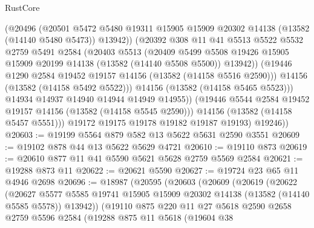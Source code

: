 \begin{lexlean}{RustCore}
\begin{coremodule}
                  (@20496
                    (@20501
                      @5472
                      @5480
                      @19311
                      @15905
                      @15909
                      @20302
                      @14138
                      (@13582 (@14140 @5480 @5473))
                      @13942))
                  (@20392
                    @308
                    @11
                    @41
                    @5513
                    @5522
                    @5532
                    @2759
                    @5491
                    @2584
                    (@20403
                      @5513
                      (@20409
                        @5499
                        @5508
                        @19426
                        @15905
                        @15909
                        @20199
                        @14138
                        (@13582 (@14140 @5508 @5500))
                        @13942))
                    (@19446 @1290 @2584 @19452 @19157 @14156 (@13582 (@14158 @5516 @2590)))
                    @14156
                    (@13582 (@14158 @5492 @5522)))
                  @14156
                  (@13582 (@14158 @5465 @5523)))
                @14934
                @14937
                @14940
                @14944
                @14949
                @14955))
            (@19446 @5544 @2584 @19452 @19157 @14156 (@13582 (@14158 @5545 @2590)))
            @14156
            (@13582 (@14158 @5457 @5551)))
          @19172
          @19175
          @19178
          @19182
          @19187
          @19193)
        @19246))
@20603 := @19199 @5564 @879 @582 @13 @5622 @5631 @2590 @3551
@20609 := @19102 @878 @44 @13 @5622 @5629 @4721
@20610 := @19110 @873
@20619 := @20610 @877 @11 @41 @5590 @5621 @5628 @2759 @5569 @2584
@20621 := @19288 @873 @11
@20622 := @20621 @5590
@20627 := @19724 @23 @65 @11 @4946 @2698
@20696 := @18987
    (@20595
      (@20603
        (@20609
          (@20619
            (@20622
              (@20627
                @5577
                @5585
                @19741
                @15905
                @15909
                @20302
                @14138
                (@13582 (@14140 @5585 @5578))
                @13942))
            (@19110
              @875
              @220
              @11
              @27
              @5618
              @2590
              @2658
              @2759
              @5596
              @2584
              (@19288
                @875
                @11
                @5618
                (@19604
                  @38

\end{coremodule}
\end{lexlean}
